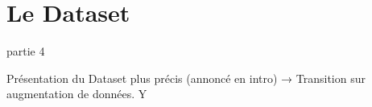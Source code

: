 \section{Le Dataset}

\begin{frame}{partie 4}
  \vspace{0.45cm}
  \begin{pointcle}
    \centering\large
    Présentation du Dataset plus précis (annoncé en intro) → Transition sur augmentation de données. Y
  \end{pointcle}
\end{frame}

